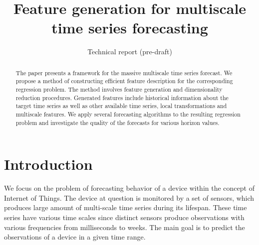 \documentclass[conference]{IEEEtran}
\begin{document}
\title{Feature generation for multiscale time series forecasting}



\date{Technical report (pre-draft)}
\maketitle

\begin{abstract}
The paper presents a framework for the massive multiscale time series forecast. We propose a method of constructing efficient feature description for the corresponding regression problem. The method involves feature generation and dimensionality reduction procedures. Generated features include historical information about the target time series as well as other available time series, local transformations and  multiscale features. We apply several forecasting algorithms to the resulting regression problem and investigate the quality of the forecasts for various horizon values.
\end{abstract}



\section{Introduction}
We focus on the problem of forecasting behavior of a device within the concept of Internet of Things. The device at question is monitored by a set of sensors, which produces large amount of multi-scale time series during its lifespan. These time series have various time scales since distinct sensors produce observations with various frequencies from milliseconds to weeks.  The main goal is to predict the observations of a device in a given time range.
\end{document}
